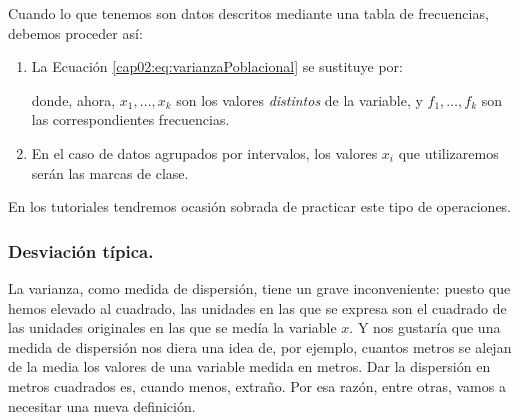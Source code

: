 Cuando lo que tenemos son datos descritos mediante una tabla de frecuencias,
debemos proceder así:
\begin{enumerate}
    \item La Ecuación \ref{cap02:eq:varianzaPoblacional} se sustituye por:
%
        \begin{center}
        \end{center}





        donde, ahora, $x_1,\ldots,x_k$ son los valores {\em distintos} de la
        variable, y $f_1,\ldots,f_k$ son las correspondientes frecuencias.

    \item En el caso de datos agrupados por intervalos, los valores $x_i$
        que utilizaremos serán las marcas de clase.

\end{enumerate}
En los tutoriales tendremos ocasión sobrada de practicar este tipo de operaciones.


\subsubsection*{Desviación típica.}

La varianza, como medida de dispersión, tiene un grave inconveniente: puesto
que hemos elevado al cuadrado, las unidades en las que se expresa son
el cuadrado de las unidades originales en las que se medía la
variable $x$. Y nos gustaría que una medida de dispersión nos diera
una idea de, por ejemplo, cuantos metros se alejan de la media los
valores de una variable medida en metros. Dar la dispersión en metros
cuadrados es, cuando menos, extraño. Por esa razón, entre otras,
vamos a necesitar una nueva definición.


